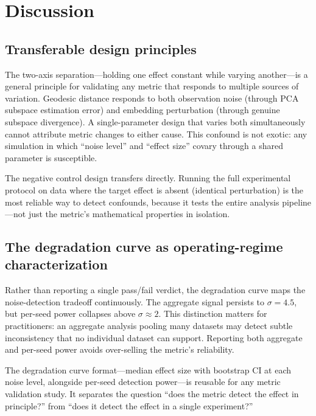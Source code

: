 \documentclass[11pt]{article}
\begin{document}
\section{Discussion}
\label{sec:discussion}

\subsection{Transferable design principles}

The two-axis separation---holding one effect constant while varying
another---is a general principle for validating any metric that
responds to multiple sources of variation.  Geodesic distance
responds to both observation noise (through PCA subspace
estimation error) and embedding perturbation (through genuine
subspace divergence).  A single-parameter design that varies both
simultaneously cannot attribute metric changes to either cause.
This confound is not exotic: any simulation in which ``noise level''
and ``effect size'' covary through a shared parameter is
susceptible.

The negative control design transfers directly.  Running the full
experimental protocol on data where the target effect is absent
(identical perturbation) is the most reliable way to detect
confounds, because it tests the entire analysis pipeline---not
just the metric's mathematical properties in isolation.

\subsection{The degradation curve as operating-regime characterization}

Rather than reporting a single pass/fail verdict, the degradation
curve maps the noise-detection tradeoff continuously.  The
aggregate signal persists to $\sigma = 4.5$, but per-seed power
collapses above $\sigma \approx 2$.  This distinction matters for
practitioners: an aggregate analysis pooling many datasets may
detect subtle inconsistency that no individual dataset can support.
Reporting both aggregate and per-seed power avoids over-selling
the metric's reliability.

The degradation curve format---median effect size with bootstrap CI
at each noise level, alongside per-seed detection power---is
reusable for any metric validation study.  It separates the
question ``does the metric detect the effect in principle?'' from
``does it detect the effect in a single experiment?''
\end{document}
